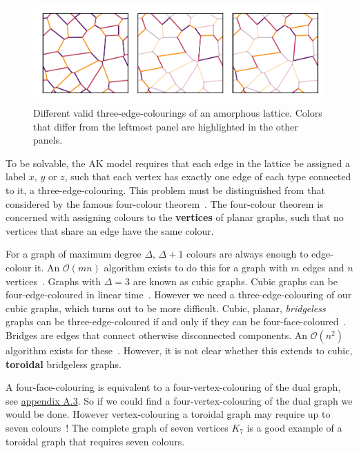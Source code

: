 \hypertarget{fig:multiple_colourings}{%
\begin{figure}
\centering
\includegraphics[width=1\textwidth,height=\textheight]{figure_code/amk_chapter/multiple_colourings/multiple_colourings}
\caption[{Colourings of an Amorphous Lattice}]{Different valid three-edge-colourings of an amorphous lattice. Colors that differ from the leftmost panel are highlighted in the other panels.}
\label{fig:multiple_colourings}
\end{figure}
}

To be solvable, the AK model requires that each edge in the lattice be assigned a label \(x\), \(y\) or \(z\), such that each vertex has exactly one edge of each type connected to it, a three-edge-colouring. This problem must be distinguished from that considered by the famous four-colour theorem~\autocite{appelEveryPlanarMap1989}. The four-colour theorem is concerned with assigning colours to the \textbf{vertices} of planar graphs, such that no vertices that share an edge have the same colour.

For a graph of maximum degree \(\Delta\), \(\Delta + 1\) colours are always enough to edge-colour it. An \(\mathcal{O}(mn)\) algorithm exists to do this for a graph with \(m\) edges and \(n\) vertices~\autocite{gEstimateChromaticClass1964}. Graphs with \(\Delta = 3\) are known as cubic graphs. Cubic graphs can be four-edge-coloured in linear time~\autocite{skulrattanakulchai4edgecoloringGraphsMaximum2002}. However we need a three-edge-colouring of our cubic graphs, which turns out to be more difficult. Cubic, planar, \emph{bridgeless} graphs can be three-edge-coloured if and only if they can be four-face-coloured~\autocite{tait1880remarks}. Bridges are edges that connect otherwise disconnected components. An \(\mathcal{O}(n^2)\) algorithm exists for these~\autocite{robertson1996efficiently}. However, it is not clear whether this extends to cubic, \textbf{toroidal} bridgeless graphs.

A four-face-colouring is equivalent to a four-vertex-colouring of the dual graph, see \protect\hyperlink{app-lattice-generation}{appendix A.3}. So if we could find a four-vertex-colouring of the dual graph we would be done. However vertex-colouring a toroidal graph may require up to seven colours~\autocite{heawoodMapColouringTheorems}! The complete graph of seven vertices \(K_7\) is a good example of a toroidal graph that requires seven colours.

